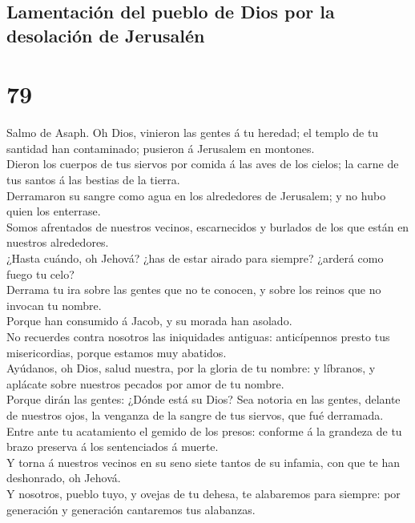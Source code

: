\hypertarget{lamentaciuxf3n-del-pueblo-de-dios-por-la-desolaciuxf3n-de-jerusaluxe9n}{%
\subsection{Lamentación del pueblo de Dios por la desolación de
Jerusalén}\label{lamentaciuxf3n-del-pueblo-de-dios-por-la-desolaciuxf3n-de-jerusaluxe9n}}

\hypertarget{section-78}{%
\section{79}\label{section-78}}

 Salmo de Asaph. Oh Dios, vinieron las gentes á tu
heredad; el templo de tu santidad han contaminado; pusieron á Jerusalem
en montones.\\
 Dieron los cuerpos de tus siervos por comida á las aves
de los cielos; la carne de tus santos á las bestias de la tierra.\\
 Derramaron su sangre como agua en los alrededores de
Jerusalem; y no hubo quien los enterrase.\\
 Somos afrentados de nuestros vecinos, escarnecidos y
burlados de los que están en nuestros alrededores.\\
 ¿Hasta cuándo, oh Jehová? ¿has de estar airado para
siempre? ¿arderá como fuego tu celo?\\
 Derrama tu ira sobre las gentes que no te conocen, y
sobre los reinos que no invocan tu nombre.\\
 Porque han consumido á Jacob, y su morada han asolado.\\
 No recuerdes contra nosotros las iniquidades antiguas:
anticípennos presto tus misericordias, porque estamos muy abatidos.\\
 Ayúdanos, oh Dios, salud nuestra, por la gloria de tu
nombre: y líbranos, y aplácate sobre nuestros pecados por amor de tu
nombre.\\
 Porque dirán las gentes: ¿Dónde está su Dios? Sea
notoria en las gentes, delante de nuestros ojos, la venganza de la
sangre de tus siervos, que fué derramada.\\
 Entre ante tu acatamiento el gemido de los presos:
conforme á la grandeza de tu brazo preserva á los sentenciados á
muerte.\\
 Y torna á nuestros vecinos en su seno siete tantos de su
infamia, con que te han deshonrado, oh Jehová.\\
 Y nosotros, pueblo tuyo, y ovejas de tu dehesa, te
alabaremos para siempre: por generación y generación cantaremos tus
alabanzas.

